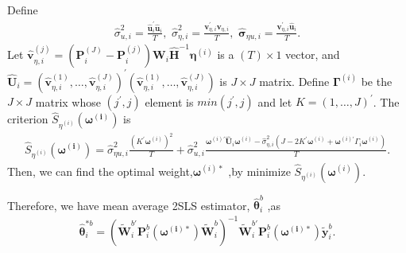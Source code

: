 \documentclass[12pt,a4paper,hyperref]{article}
\begin{document}
 Define
 \begin{align}
 \hat{\sigma}^{ 2}_{u, i}=\frac{\hat{\boldsymbol{u}}^{'}_{i} \hat{\boldsymbol{u}}_{i}}{T}, \,\, \hat{\sigma}^{2}_{\eta, i}=\frac{\boldsymbol{v}^{ '}_{\eta, i} \boldsymbol{v}_{\eta, i}}{T}, \,\, \hat{\boldsymbol{\sigma}}_{\eta u, i}=\frac{\boldsymbol{v}^{'}_{\eta, i} \hat{\boldsymbol{u}}_{i}}{T}.
 \end{align}
 Let $\hat{\boldsymbol{v}}^{(j)}_{\eta, i}=\left(\boldsymbol{P}_{i}^{(J)}- \boldsymbol{P}_{i}^{(j)}\right)\boldsymbol{W}_{i}  \hat{\boldsymbol{H}}^{-1}\boldsymbol{\eta}^{(i)}$ is a $(T) \times 1$ vector, and $\hat{\boldsymbol{U}}_{i}=\left(\hat{\boldsymbol{v}}^{(1)}_{\eta, i}, \ldots, \hat{\boldsymbol{v}}^{(J)}_{\eta, i} \right)^{'}\left(\hat{\boldsymbol{v}}^{(1)}_{\eta, i}, \ldots, \hat{\boldsymbol{v}}^{(J)}_{\eta, i} \right)$ is $J \times J$ matrix. Define $\boldsymbol{\Gamma}^{(i)}$ be the $J \times J$ matrix whose $(j^{'}, j)$ element is $min(j^{'}, j)$ and let $K=(1, \ldots, J)^{'}$. The criterion $\hat{S}_{\eta^{(i)}}\left(\boldsymbol{\omega^{(i)}} \right)$ is
 \begin{align}
 \hat{S}_{\eta^{(i)}}\left(\boldsymbol{\omega^{(i)}} \right)=\hat{\sigma}^{2}_{\eta u, i} \frac{(K^{'}\boldsymbol{\omega}^{(i)})^{2}}{T}+\hat{\sigma}^{2}_{u,i}\frac{\boldsymbol{\omega}^{(i)'}\hat{\boldsymbol{U}}_{i}\boldsymbol{\omega}^{(i)}-\hat{\sigma}^{ 2}_{\eta, i}(J-2K^{'}\boldsymbol{\omega}^{(i)}+\boldsymbol{\omega}^{(i)'}\Gamma_{i} \boldsymbol{\omega}^{(i)})}{T}.
 \end{align}
 Then, we can find the optimal weight,$\boldsymbol{\omega}^{(i)\ast}$ ,by minimize $\hat{S}_{\eta^{(i)}}(\boldsymbol{\omega}^{(i)})$.

















Therefore, we have mean average 2SLS estimator, $\hat{\boldsymbol{\theta}}^{b}_{i}$ ,as
\begin{align}
\hat{\boldsymbol{\theta}}^{\ast b}_{i}= \left( \tilde{\boldsymbol{W}}^{b'}_{i}\boldsymbol{P}^{b}_{i}\left(\boldsymbol{\omega^{(i)\ast}} \right)\tilde{\boldsymbol{W}}^{b}_{i} \right)^{-1} \tilde{\boldsymbol{W}}^{b'}_{i}\boldsymbol{P}^{b}_{i}\left(\boldsymbol{\omega^{(i)\ast}} \right) \tilde{\boldsymbol{y}}^{b}_{i}.
\end{align}
\end{document}

